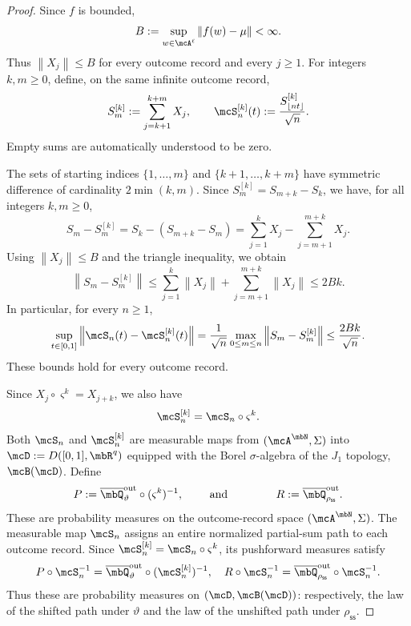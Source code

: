 \documentclass[a4paper]{article}
\numberwithin{equation}{section}   %
\theoremstyle{plain}   %
\theoremstyle{plain}   %
\theoremstyle{examplestyle}
\newcommand{\s}{\rho_{\mathsf{ss}}}     %
\newcommand{\unorm}[1]{\left\lVert#1\right\rVert}
\begin{document}
\begin{proof}
    Since $f$ is bounded,
    \[
        B:=\sup_{w\in\mcA^\ell}
            \unorm{f(w)-\mu}<\infty.
    \]
    Thus $\unorm{X_j}\le B$ for every outcome record and every $j\ge1$.
    For integers $k,m\ge0$, define, on the same infinite outcome record,
    \[
        S_m^{[k]}
        :=\sum_{j=k+1}^{k+m}X_j,
        \qquad
        \mcS_n^{[k]}(t)
        :=\frac{S_{\lfloor nt\rfloor}^{[k]}}{\sqrt n}.
    \]
    Empty sums are automatically understood to be zero.

    The sets of starting indices $\{1,\ldots,m\}$ and $\{k+1,\ldots,k+m\}$ have symmetric difference of cardinality $2\min(k,m)$. 
    Since $S_m^{[k]}=S_{m+k}-S_k$, we have, for all integers $k,m\ge0$,
    \[
        S_m-S_m^{[k]}
        =S_k-(S_{m+k}-S_m)
        =\sum_{j=1}^{k}X_j
         -\sum_{j=m+1}^{m+k}X_j.
    \]
    Using $\unorm{X_j}\le B$ and the triangle inequality, we obtain
    \[
        \unorm{S_m-S_m^{[k]}}
        \le
        \sum_{j=1}^{k}\unorm{X_j}
        +\sum_{j=m+1}^{m+k}\unorm{X_j}
        \le2Bk.
    \]
    In particular, for every $n\ge1$,
        \begin{equation}
        \label{univ:eq:boundary}
            \sup_{t\in[0,1]}
                \unorm{
                    \mcS_n(t)-\mcS_n^{[k]}(t)
                }
            =
            \frac1{\sqrt n}
            \max_{0\le m\le n}
                \unorm{S_m-S_m^{[k]}}
            \le\frac{2Bk}{\sqrt n}.
        \end{equation}
    These bounds hold for every outcome record.

    Since $X_j\circ\varsigma^k=X_{j+k}$, we also have
    \[
        \mcS_n^{[k]}
        =\mcS_n\circ\varsigma^k.
    \]
    Both $\mcS_n$ and $\mcS_n^{[k]}$ are measurable maps from $(\mcA^\mbN,\Sigma)$ into $\mcD:= D([0,1],\mbR^q)$ equipped with the Borel
    $\sigma$-algebra of the $J_1$ topology, \(\mcB(\mcD)\).
    Define
    \[
        P:=
        \overline\mbQ^{\mathrm{out}}_\vartheta
            \circ(\varsigma^k)^{-1},\qquad\text{ and }\qquad
        \qquad
        R:=\overline\mbQ^{\mathrm{out}}_{\s}.
    \]
    These are probability measures on the outcome-record space $(\mcA^\mbN,\Sigma)$.
    The measurable map $\mcS_n$ assigns an entire normalized partial-sum path to each outcome record.
    Since $\mcS_n^{[k]}=\mcS_n\circ\varsigma^k$, its pushforward measures satisfy
    \[
        \begin{aligned}
            P\circ\mcS_n^{-1}
            =
            \overline\mbQ^{\mathrm{out}}_\vartheta
                \circ(\mcS_n^{[k]})^{-1},\quad
            R\circ\mcS_n^{-1}
            =
            \overline\mbQ^{\mathrm{out}}_{\s}
                \circ\mcS_n^{-1}.
        \end{aligned}
    \]
    Thus these are probability measures on $(\mcD,\mcB(\mcD))$: respectively, the law of the shifted path under $\vartheta$ and the law of the unshifted path under $\s$.


\end{proof}
\end{document}
